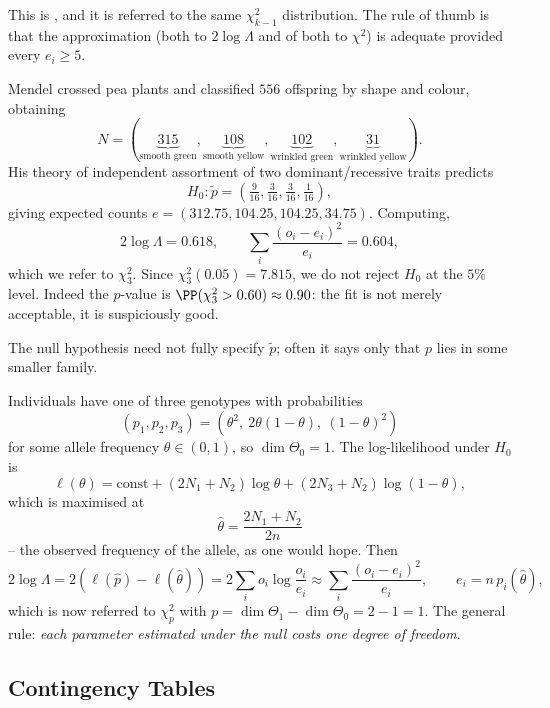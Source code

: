 This is , and it is referred to the same $\chi^2_{k-1}$ distribution. The rule of thumb is that the approximation (both to $2\log\Lambda$ and of both to $\chi^2$) is adequate provided every $e_i \geq 5$.

\begin{example}
  Mendel crossed pea plants and classified $556$ offspring by shape and colour, obtaining
  $$
  N = (\underbrace{315}_{\text{smooth green}}, \underbrace{108}_{\text{smooth yellow}}, \underbrace{102}_{\text{wrinkled green}}, \underbrace{31}_{\text{wrinkled yellow}}).
  $$
  His theory of independent assortment of two dominant/recessive traits predicts
  $$
  H_0 : \tilde p = \left(\tfrac{9}{16}, \tfrac{3}{16}, \tfrac{3}{16}, \tfrac{1}{16}\right),
  $$
  giving expected counts $e = (312.75, 104.25, 104.25, 34.75)$. Computing,
  $$
  2\log\Lambda = 0.618, \qquad \sum_i\frac{(o_i-e_i)^2}{e_i} = 0.604,
  $$
  which we refer to $\chi^2_3$. Since $\chi^2_3(0.05) = 7.815$, we do not reject $H_0$ at the $5\%$ level. Indeed the $p$-value is $\PP(\chi^2_3 > 0.60) \approx 0.90$: the fit is not merely acceptable, it is suspiciously good.
\end{example}

The null hypothesis need not fully specify $\tilde p$; often it says only that $p$ lies in some smaller family.

\begin{example}
  Individuals have one of three genotypes with probabilities
  $$
  \left(p_1,p_2,p_3\right) = \left(\theta^2,\ 2\theta(1-\theta),\ (1-\theta)^2\right)
  $$
  for some allele frequency $\theta \in (0,1)$, so $\dim\Theta_0 = 1$. The log-likelihood under $H_0$ is
  $$
  \ell(\theta) = \text{const} + (2N_1 + N_2)\log\theta + (2N_3+N_2)\log(1-\theta),
  $$
  which is maximised at
  $$
  \hat\theta = \frac{2N_1+N_2}{2n}
  $$
  -- the observed frequency of the allele, as one would hope. Then
  $$
  2\log\Lambda = 2\left(\ell(\hat p) - \ell(\hat\theta)\right) = 2\sum_i o_i \log\frac{o_i}{e_i} \approx \sum_i \frac{(o_i-e_i)^2}{e_i}, \qquad e_i = n\,p_i(\hat\theta),
  $$
  which is now referred to $\chi^2_p$ with $p = \dim\Theta_1 - \dim\Theta_0 = 2 - 1 = 1$. The general rule: \emph{each parameter estimated under the null costs one degree of freedom}.
\end{example}

\subsection{Contingency Tables}

